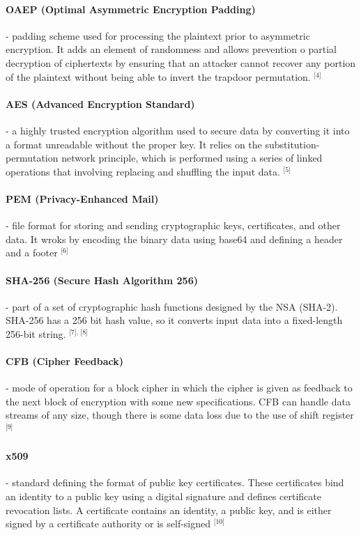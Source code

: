 \documentclass[12pt, a4paper]{report}
\begin{document}
\paragraph{OAEP (Optimal Asymmetric Encryption Padding)} - padding scheme used for processing the plaintext prior to asymmetric encryption. It adds an element of randomness and allows prevention o partial decryption of ciphertexts by ensuring that an attacker cannot recover any portion of the plaintext without being able to invert the trapdoor permutation. \(^{\text{[4]}}\)

\paragraph{AES (Advanced Encryption Standard)} - a highly trusted encryption algorithm used to secure data by converting it into a format unreadable without the proper key. It relies on the substitution-permutation network principle, which is performed using a series of linked operations that involving replacing and shuffling the input data. \(^{\text{[5]}}\)

\paragraph{PEM (Privacy-Enhanced Mail)} - file format for storing and sending cryptographic keys, certificates, and other data. It wroks by encoding the binary data using base64 and defining a header and a footer \(^{\text{[6]}}\)

\paragraph{SHA-256 (Secure Hash Algorithm 256)} - part of a set of cryptographic hash functions designed by the NSA (SHA-2). SHA-256 has a 256 bit hash value, so it converts input data into a fixed-length 256-bit string.  \(^{\text{[7], [8]}}\)

\paragraph{CFB (Cipher Feedback)} - mode of operation for a block cipher in which the cipher is given as feedback to the next block of encryption with some new specifications. CFB can handle data streams of any size, though there is some data loss due to the use of shift register \(^{\text{[9]}}\)

\paragraph{x509} - standard defining the format of public key certificates. These certificates bind an identity to a public key using a digital signature and defines certificate revocation lists.  A certificate contains an identity, a public key, and is either signed by a certificate authority or is self-signed \(^{\text{[10]}}\)
\end{document}
